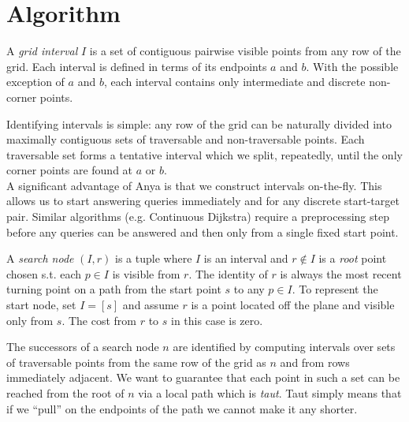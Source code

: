 \section{Algorithm}

\begin{definition}
\label{definition::anya::interval}
A \emph{grid interval} $I$ is a set of contiguous pairwise visible points 
from any row of the grid.  Each interval is defined in terms 
of its endpoints $a$ and $b$. 
With the possible exception of $a$ and $b$, each interval
contains only intermediate and discrete non-corner points.
\end{definition}
Identifying intervals is simple: any row of the grid can be naturally divided
into maximally contiguous sets of traversable and non-traversable points.
Each traversable set forms a tentative interval which we split, repeatedly,
until the only corner points are found at $a$ or $b$.
\\
A significant advantage of Anya is that we construct intervals on-the-fly.
This allows us to start answering queries immediately and for any discrete
start-target pair. Similar algorithms (e.g. Continuous Dijkstra) require
a preprocessing step before any queries can be answered and then only
from a single fixed start point. 

\begin{definition}
\label{definition::anya::searchnode}
A \emph{search node} $(I, r)$ is a tuple where $I$ is an interval and 
$r \not \in I$ is a \emph{root} point chosen s.t. each $p \in I$  
is visible from $r$. The identity of $r$ is always the most
recent turning point on a path from the start point $s$ to any $p \in I$.
To represent the start node, set $I = [s]$ and assume $r$ is a point located 
off the plane and visible only from $s$. The cost from $r$ to $s$ in this case
is zero.
\end{definition}
The successors of a search node $n$ are identified by computing intervals
over sets of traversable points from the same row of the grid as $n$ and from rows
immediately adjacent. We want to guarantee that each point in such
a set can be reached from the root of $n$ via a local path which is \emph{taut}.
Taut simply means that if we ``pull'' on the endpoints of the path we cannot
make it any shorter.

